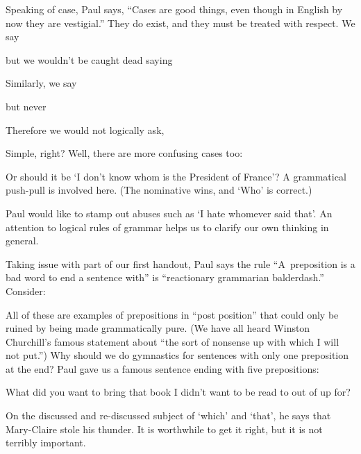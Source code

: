 Speaking of case, Paul says, ``Cases are good things, even though in
English by now they are vestigial.''  They do exist, and they must be
treated with respect. We say
\par\nobreak\smallskip
{}
but we wouldn't be caught dead saying
\par\nobreak\smallskip
{}
Similarly, we say
\par\nobreak\smallskip
{}
but never
\par\nobreak\smallskip
{}
Therefore we would not logically ask,
\par\nobreak\smallskip
{}
Simple, right? Well, there are
more confusing cases too:
\par\nobreak\smallskip
{}
Or should it be `I don't know
whom is the President of France'?  A grammatical push-pull
is involved here. (The nominative wins, and
`Who' is correct.)

Paul would like to stamp out abuses such as `I hate whomever said that'.
An attention to logical rules of grammar helps us to clarify our own
thinking in general.

Taking issue with part of our first handout, Paul says the rule ``A~preposition is
a bad word to end a sentence with'' is ``reactionary grammarian balderdash.''
Consider:
\par\nobreak\smallskip
{}
All of these are examples of prepositions in ``post position'' that could
only be ruined by being made grammatically pure. (We
have all heard Winston Churchill's famous
statement about ``the sort of nonsense up with which I will not
put.'')  Why should we do gymnastics for sentences with only one
preposition at the end?  Paul gave us a famous sentence ending with five
prepositions:

{\narrower\par\nobreak\smallskip\noindent
	What did you want to bring that book I didn't 
	want to be read to out of up for?
\smallskip}

On the discussed and re-discussed subject of `which' and `that', he says
that Mary-Claire stole his thunder. It is worthwhile to get it right, but
it is not terribly important.

